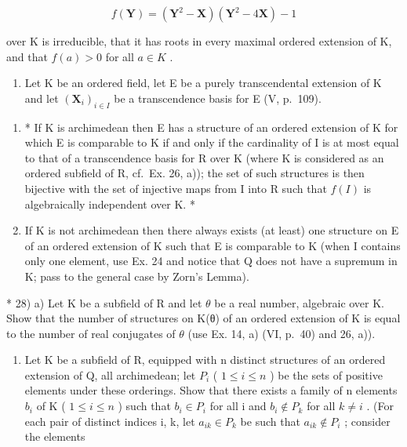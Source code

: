 \[
f (\mathbf {Y}) = (\mathbf {Y} ^ {2} - \mathbf {X}) (\mathbf {Y} ^ {2} - 4 \mathbf {X}) - 1
\]

over K is irreducible, that it has roots in every maximal ordered extension of K, and that \(f(a) > 0\) for all \(a \in K\) .

\begin{enumerate}
\def\labelenumi{\arabic{enumi})}
\setcounter{enumi}{26}
\tightlist
\item
  Let K be an ordered field, let E be a purely transcendental extension of K and let \((\mathbf{X}_{i})_{i\in I}\) be a transcendence basis for E (V, p.~109).
\end{enumerate}

\begin{enumerate}
\def\labelenumi{\alph{enumi})}
\item
  * If K is archimedean then E has a structure of an ordered extension of K for which E is comparable to K if and only if the cardinality of I is at most equal to that of a transcendence basis for R over K (where K is considered as an ordered subfield of R, cf.~Ex. 26, a)); the set of such structures is then bijective with the set of injective maps from I into R such that \(f(I)\) is algebraically independent over K. *
\item
  If K is not archimedean then there always exists (at least) one structure on E of an ordered extension of K such that E is comparable to K (when I contains only one element, use Ex. 24 and notice that Q does not have a supremum in K; pass to the general case by Zorn's Lemma).
\end{enumerate}

* 28) a) Let K be a subfield of R and let \(\theta\) be a real number, algebraic over K. Show that the number of structures on K(θ) of an ordered extension of K is equal to the number of real conjugates of \(\theta\) (use Ex. 14, a) (VI, p.~40) and 26, a)).

\begin{enumerate}
\def\labelenumi{\alph{enumi})}
\setcounter{enumi}{1}
\tightlist
\item
  Let K be a subfield of R, equipped with n distinct structures of an ordered extension of Q, all archimedean; let \(P_{i}\) ( \(1 \leqslant i \leqslant n\) ) be the sets of positive elements under these orderings. Show that there exists a family of n elements \(b_{i}\) of K ( \(1 \leqslant i \leqslant n\) ) such that \(b_{i} \in P_{i}\) for all i and \(b_{i} \notin P_{k}\) for all \(k \neq i\) . (For each pair of distinct indices i, k, let \(a_{ik} \in P_{k}\) be such that \(a_{ik} \notin P_{i}\) ; consider the elements
\end{enumerate}

